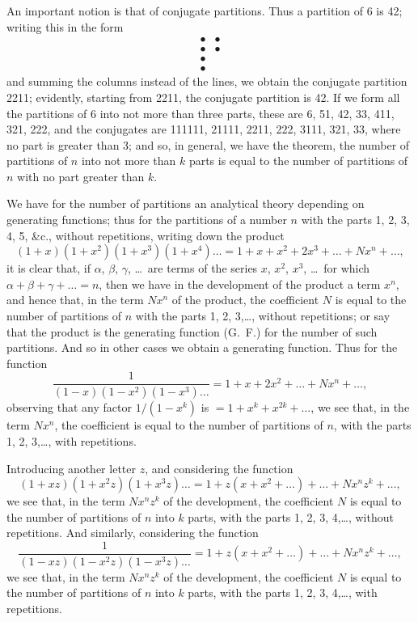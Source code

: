\documentclass[11pt,a4paper]{book}
\begin{document}
An important notion is that of conjugate partitions. Thus a partition of 6 is 42; writing this in the form
\[
\begin{array}{cc}
\bullet & \bullet \\
\bullet & \bullet \\
\bullet & \\
\bullet &
\end{array}
\]
and summing the columns instead of the lines, we obtain the conjugate partition 2211; evidently, starting from 2211, the conjugate partition is 42. If we form all the partitions of 6 into not more than three parts, these are 6, 51, 42, 33, 411, 321, 222, and the conjugates are 111111, 21111, 2211, 222, 3111, 321, 33, where no part is greater than 3; and so, in general, we have the theorem, the number of partitions of $n$ into not more than $k$ parts is equal to the number of partitions of $n$ with no part greater than $k$.

We have for the number of partitions an analytical theory depending on generating functions; thus for the partitions of a number $n$ with the parts 1, 2, 3, 4, 5, \&c., without repetitions, writing down the product
\[
(1 + x)(1 + x^{2})(1 + x^{3})(1 + x^{4})\ldots = 1 + x + x^{2} + 2x^{3} + \ldots + Nx^{n} + \ldots,
\]
it is clear that, if $\alpha$, $\beta$, $\gamma$, \ldots\ are terms of the series $x$, $x^{2}$, $x^{3}$, \ldots\ for which $\alpha + \beta + \gamma + \ldots = n$, then we have in the development of the product a term $x^{n}$, and hence that, in the term $Nx^{n}$ of the product, the coefficient $N$ is equal to the number of partitions of $n$ with the parts 1, 2, 3,\ldots, without repetitions; or say that the product is the generating function (G.\ F.) for the number of such partitions. And so in other cases we obtain a generating function. Thus for the function
\[
\frac{1}{(1 - x)(1 - x^{2})(1 - x^{3})\ldots} = 1 + x + 2x^{2} + \ldots + Nx^{n} + \ldots,
\]
observing that any factor $1/(1 - x^{k})$ is $= 1 + x^{k} + x^{2k} + \ldots$, we see that, in the term $Nx^{n}$, the coefficient is equal to the number of partitions of $n$, with the parts 1, 2, 3,\ldots, with repetitions.

Introducing another letter $z$, and considering the function
\[
(1 + xz)(1 + x^{2}z)(1 + x^{3}z)\ldots = 1 + z(x + x^{2} + \ldots) + \ldots + Nx^{n}z^{k} + \ldots,
\]
we see that, in the term $Nx^{n}z^{k}$ of the development, the coefficient $N$ is equal to the number of partitions of $n$ into $k$ parts, with the parts 1, 2, 3, 4,\ldots, without repetitions. And similarly, considering the function
\[
\frac{1}{(1 - xz)(1 - x^{2}z)(1 - x^{3}z)\ldots} = 1 + z(x + x^{2} + \ldots) + \ldots + Nx^{n}z^{k} + \ldots,
\]
we see that, in the term $Nx^{n}z^{k}$ of the development, the coefficient $N$ is equal to the number of partitions of $n$ into $k$ parts, with the parts 1, 2, 3, 4,\ldots, with repetitions.
\end{document}
